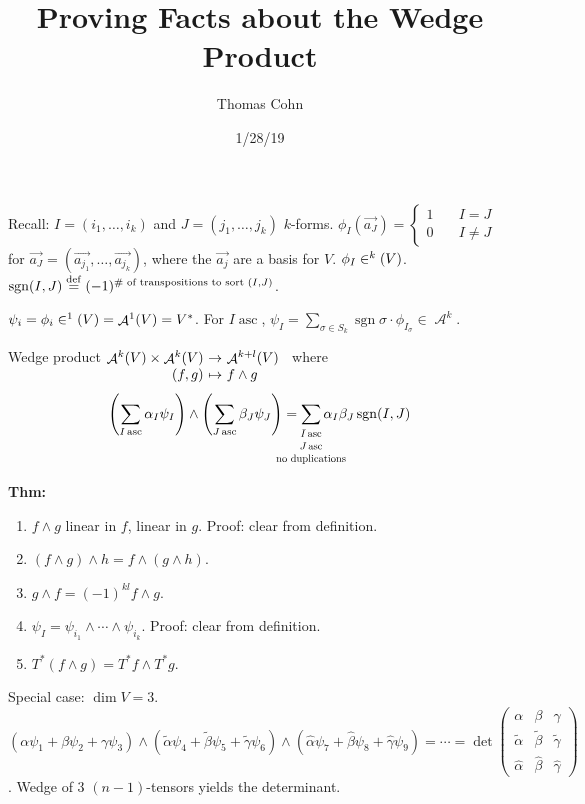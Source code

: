 \documentclass[10pt,letterpaper]{article}
\author{Thomas Cohn}
\title{Proving Facts about the Wedge Product}
\date{1/28/19} %
\newcommand{\n}{\hfill\break}
\newcommand{\up}{\vspace{-\baselineskip}}
\newcommand{\thm}[1]{\par\noindent\settowidth{\hangindent}{\textbf{Thm: }}\textbf{Thm: }#1\n}
\newcommand{\ptxt}[1]{\textrm{\textnormal{#1}}}
\DeclareMathOperator{\sgn}{sgn}
\newcommand{\map}[4]{\!\!\!\begin{array}[t]{rcl}#1 & \!\!\!\!\to & \!\!\!\!#2\\ #3 & \!\!\!\!\mapsto & \!\!\!\!#4\end{array}}
\newcommand{\bigsum}[2]{\smashoperator[lr]{\sum_{\scalebox{#1}{$#2$}}}}
\let\L\relax
\DeclareMathOperator{\L}{\mathscr{L}}
\DeclareMathOperator{\A}{\mathcal{A}}
\DeclareMathOperator{\asc}{asc}
\newcommand{\eqdef}{\overset{\ptxt{def}}{=}}
\newcommand{\paren}[1]{\left(#1\right)}
\begin{document}
\maketitle
\setlength\RaggedRightParindent{\parindent}
\RaggedRight

\par\noindent Recall:\n
$I=(i_{1},\ldots,i_{k})$ and $J=(j_{1},\ldots,j_{k})$ $k$-forms. $\phi_{I}(\vec{a_{J}})=\left\{\begin{array}{ll}1 & \quad{}I=J\\ 0 & \quad{}I\ne{}J\end{array}\right.$ for $\vec{a_{J}}=(\vec{a_{j_{1}}},\ldots,\vec{a_{j_{k}}})$, where the $\vec{a_{j}}$ are a basis for $V$.\n
$\phi_{I}\in\L^{k}(V)$.\n
$\sgn(I,J)\eqdef(-1)^{\ptxt{\# of transpositions to sort }(I,J)}$.\n

\par\noindent $\psi_{i}=\phi_{i}\in\L^{1}(V)=\A^{1}(V)=V^{*}$. For $I\asc$, $\psi_{I}=\sum_{\sigma\in{}S_{k}}\sgn\sigma\cdot\phi_{I_{\sigma}}\in\A^{k}$.\n

\par\noindent Wedge product $\map{\A^{k}(V)\times\A^{k}(V)}{\A^{k+l}(V)}{(f,g)}{f\wedge{}g}$ where
\[
\paren{\sum_{I\asc}\alpha_{I}\psi_{I}}\wedge\paren{\sum_{J\asc}\beta_{J}\psi_{J}}=\bigsum{0.75}{\begin{array}{c}I\asc\\ J\asc\\ \ptxt{no duplications}\end{array}}\alpha_{I}\beta_{J}\sgn(I,J)
\]

\thm{\begin{enumerate}[label=(\alph*)]
	\item $f\wedge{}g$ linear in $f$, linear in $g$.\n
	Proof: clear from definition.
	\item $(f\wedge{}g)\wedge{}h=f\wedge(g\wedge{}h)$.
	\item $g\wedge{}f=(-1)^{kl}f\wedge{}g$.
	\item $\psi_{I}=\psi_{i_{1}}\wedge\cdots\wedge\psi_{i_{k}}$.\n
	Proof: clear from definition.
	\item $T^{*}(f\wedge{}g)=T^{*}f\wedge{}T^{*}g$.
\end{enumerate}}\up

\par\noindent Special case: $\dim{}V=3$.\n
$(\alpha\psi_{1}+\beta\psi_{2}+\gamma\psi_{3})\wedge(\tilde{\alpha}\psi_{4}+\tilde{\beta}\psi_{5}+\tilde{\gamma}\psi_{6})\wedge(\hat{\alpha}\psi_{7}+\hat{\beta}\psi_{8}+\hat{\gamma}\psi_{9})=\cdots=\det\paren{\begin{array}{ccc}\alpha & \beta & \gamma\\ \tilde{\alpha} & \tilde{\beta} & \tilde{\gamma}\\ \hat{\alpha} & \hat{\beta} & \hat{\gamma}\end{array}}$.\up\n
Wedge of $3$ $(n-1)$-tensors yields the determinant.\n
\end{document}
